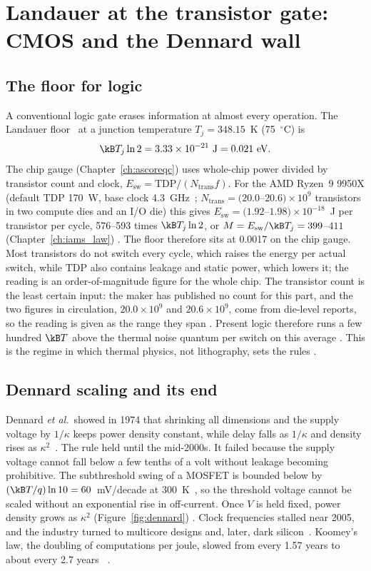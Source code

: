 \chapter{Landauer at the transistor gate: CMOS and the Dennard wall}\label{ch:cmos}

\section{The floor for logic}

A conventional logic gate erases information at almost every operation. The Landauer floor~\cite{Landauer1961} at
a junction temperature $T_j=348.15$~K (75~$^\circ$C) is
\begin{equation}
 \kB T_j\ln2=3.33\times10^{-21}\ \mathrm J=0.021\ \mathrm{eV}.
\end{equation}
The chip gauge (Chapter~\ref{ch:ascoreqc}) uses whole-chip power divided by transistor count and clock,
$E_{\mathrm{sw}}=\mathrm{TDP}/(N_{\mathrm{trans}}f)$. For the AMD Ryzen~9 9950X (default TDP 170~W, base clock 4.3~GHz~\cite{AMD9950X};
$N_{\mathrm{trans}}=(20.0$--$20.6)\times10^9$ transistors in two compute dies and an I/O die) this gives $E_{\mathrm{sw}}=(1.92$--$1.98)\times10^{-18}$~J
per transistor per cycle, 576--593 times $\kB T_j\ln2$, or $M=E_{\mathrm{sw}}/\kB T_j=399$--$411$ (Chapter~\ref{ch:iams_law}) \calc. The
floor therefore sits at 0.0017 on the chip gauge. Most transistors do not switch every cycle,
which raises the energy per actual switch, while TDP also contains leakage and static power, which lowers it; the reading is an
order-of-magnitude figure for the whole chip. The transistor count is the least certain input: the maker has published no count for this part, and the two figures in
circulation, $20.0\times10^9$ and $20.6\times10^9$, come from die-level reports, so the reading is given as the range they span \openprob. Present logic therefore runs a few hundred $\kB T$ above the thermal noise quantum per
switch on this average \calc. This is the regime in which thermal physics, not lithography, sets the rules \interp.

\section{Dennard scaling and its end}

Dennard \emph{et al.}\ showed in 1974 that shrinking all dimensions and the supply voltage by
$1/\kappa$ keeps power density constant, while delay falls as $1/\kappa$ and density rises
as $\kappa^2$~\cite{Dennard1974}. The rule held until the mid-2000s. It failed because the
supply voltage cannot fall below a few tenths of a volt without leakage becoming prohibitive.
The subthreshold swing of a MOSFET is bounded below by $(\kB T/q)\ln10=60$~mV/decade at
300~K~\cite{Sze2006}, so the threshold voltage cannot be scaled without an exponential rise
in off-current. Once $V$ is held fixed, power density grows as $\kappa^2$
(Figure~\ref{fig:dennard}) \derived. Clock frequencies stalled near 2005, and the industry turned to
multicore designs and, later, dark silicon~\cite{Esmaeilzadeh2011}. Koomey's law, the doubling
of computations per joule, slowed from every 1.57 years to about every 2.7 years~\cite{Koomey2011,Koomey2016} \observed.

